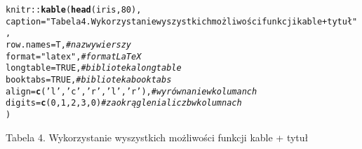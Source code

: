 \documentclass[a4paper, 10pt]{article}\usepackage[]{graphicx}\usepackage[]{color}
\makeatletter
\newcommand{\hlnum}[1]{\textcolor[rgb]{0.686,0.059,0.569}{#1}}%
\newcommand{\hlstr}[1]{\textcolor[rgb]{0.192,0.494,0.8}{#1}}%
\newcommand{\hlcom}[1]{\textcolor[rgb]{0.678,0.584,0.686}{\textit{#1}}}%
\newcommand{\hlstd}[1]{\textcolor[rgb]{0.345,0.345,0.345}{#1}}%
\newcommand{\hlkwc}[1]{\textcolor[rgb]{0.333,0.667,0.333}{#1}}%
\newcommand{\hlkwd}[1]{\textcolor[rgb]{0.737,0.353,0.396}{\textbf{#1}}}%
\newenvironment{kframe}{%
 \def\at@end@of@kframe{}%
 \ifinner\ifhmode%
  \def\at@end@of@kframe{\end{minipage}}%
  \begin{minipage}{\columnwidth}%
 \fi\fi%
 \def\FrameCommand##1{\hskip\@totalleftmargin \hskip-\fboxsep
 \colorbox{shadecolor}{##1}\hskip-\fboxsep
     \hskip-\linewidth \hskip-\@totalleftmargin \hskip\columnwidth}%
 \MakeFramed {\advance\hsize-\width
   \@totalleftmargin\z@ \linewidth\hsize
   \@setminipage}}%
 {\par\unskip\endMakeFramed%
 \at@end@of@kframe}
\makeatother
\begin{document}
\begin{kframe}
\begin{alltt}
\hlstd{knitr::} \hlkwd{kable}\hlstd{(} \hlkwd{head}\hlstd{(iris,} \hlnum{80}\hlstd{) ,}
        \hlkwc{caption}\hlstd{=}\hlstr{"Tabela 4. Wykorzystanie wyszystkich możliwości funkcji kable + tytuł"}\hlstd{,}
        \hlkwc{row.names} \hlstd{= T,} \hlcom{# nazwy wierszy}
        \hlkwc{format}\hlstd{=}\hlstr{"latex"}\hlstd{,} \hlcom{# format LaTeX}
        \hlkwc{longtable}\hlstd{=}\hlnum{TRUE}\hlstd{,}  \hlcom{# biblioteka longtable}
        \hlkwc{booktabs}\hlstd{=}\hlnum{TRUE}\hlstd{,} \hlcom{# biblioteka booktabs}
        \hlkwc{align}\hlstd{=}\hlkwd{c}\hlstd{(}\hlstr{'l'}\hlstd{,} \hlstr{'c'}\hlstd{,} \hlstr{'r'}\hlstd{,} \hlstr{'l'}\hlstd{,} \hlstr{'r'}\hlstd{),} \hlcom{# wyrównanie w kolumanch}
        \hlkwc{digits}\hlstd{=}\hlkwd{c}\hlstd{(}\hlnum{0}\hlstd{,}\hlnum{1}\hlstd{,}\hlnum{2}\hlstd{,}\hlnum{3}\hlstd{,}\hlnum{0}\hlstd{)} \hlcom{# zaokrąglenia liczb w kolumnach}
        \hlstd{)}
\end{alltt}
\end{kframe}
\caption{Tabela 4. Wykorzystanie wyszystkich możliwości funkcji kable + tytuł}
\end{document}
